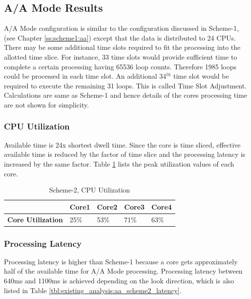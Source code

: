 \subsection{A/A Mode Results}
\label{ss:scheme2:aa}
A/A Mode configuration is similar to the configuration discussed in Scheme-1, (see Chapter \ref{ss:scheme1:aa}) except that the data is distributed to 24 CPUs. There may be some additional time slots required to fit the processing into the allotted time slice. For instance, 33 time slots would provide sufficient time to complete a certain processing having 65536 loop counts. Therefore 1985 loops could be processed in each time slot. An additional 34$^{th}$ time slot would be required to execute the remaining 31 loops. This is called Time Slot Adjustment. Calculations are same as Scheme-1 and hence details of the cores processing time are not shown for simplicity.

\subsubsection{CPU Utilization}
\label{sss:scheme2:cpu_util}
Available time is 24x shortest dwell time. Since the core is time sliced, effective available time is reduced by the factor of time slice and the processing latency is increased by the same factor. Table \ref{tbl:existing_analysis:aa_scheme2_cpu_util} lists the peak utilization values of each core.

\begin{table}[h!]
	\centering
	\begin{tabular}{|l|l|l|l|l|} 
	 \hline
	 & \textbf{Core1} & \textbf{Core2} & \textbf{Core3} & \textbf{Core4} \\ \hline
	 \textbf{Core Utilization} & 25\% & 53\% & 71\% & 63\% \\ \hline
	\end{tabular}
	\caption{Scheme-2, CPU Utilization}
	\label{tbl:existing_analysis:aa_scheme2_cpu_util}
\end{table}

\subsubsection{Processing Latency}
\label{sss:scheme2:latency}
Processing latency is higher than Scheme-1 because a core gets approximately half of the available time for A/A Mode processing. Processing latency between 640ms and 1100ms is achieved depending on the look direction, which is also listed in Table \ref{tbl:existing_analysis:aa_scheme2_latency}.

